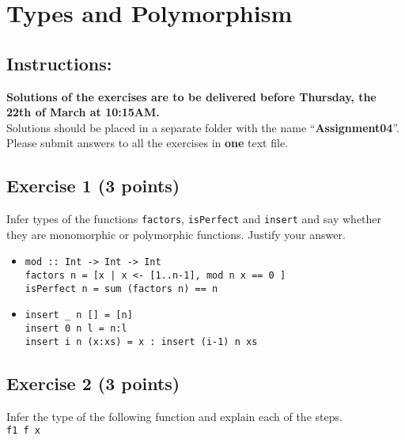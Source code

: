 \documentclass [11pt, a4wide, twoside]{article}
\begin{document}
\section*{Types and Polymorphism}


\subsection*{Instructions:}

\textbf{Solutions of the exercises are to be delivered before Thursday, the 22th of March at 10:15AM.}\\
Solutions should be placed in a separate folder with the name ``\textbf{Assignment04}''.\\
Please submit answers to all the exercises in \textbf{one} text file.\\

\subsection*{Exercise 1 (3 points)}

Infer types of the functions \texttt{factors}, \texttt{isPerfect} and \texttt{insert} and say whether they are monomorphic or polymorphic functions. Justify your answer.

\begin{itemize}
\item \texttt{mod :: Int -> Int -> Int\\
factors n = [x | x <- [1..n-1], mod n x == 0 ] \\
isPerfect n = sum (factors n) == n}

\item \texttt{insert \_ n [] = [n]\\
insert 0 n l = n:l \\
insert i n (x:xs) = x : insert (i-1) n xs}
\end{itemize}

\vspace{0.2cm}
\solution{}

\subsection*{Exercise 2 (3 points)}

Infer the type of the following function and explain each of the steps.\\
\texttt{f1 f x}
\end{document}
